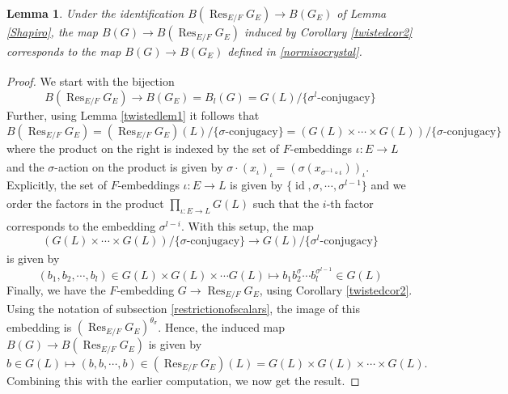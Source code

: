 \documentclass[11pt,a4paper]{article}
\theoremstyle{definition}
\theoremstyle{plain}
\newtheorem{Le}[shared]{Lemma}
\theoremstyle{remark}
\theoremstyle{plain}
\DeclareMathOperator{\Res}{Res}
\DeclareMathOperator{\id}{id}
\begin{document}
\begin{Le}
    Under the identification $B(\Res_{E/F}G_E) \xrightarrow[]{} B(G_E)$ of Lemma \ref{Shapiro}, the map $B(G) \xrightarrow[]{} B(\Res_{E/F}G_E)$ induced by Corollary \ref{twistedcor2} corresponds to the map $B(G) \xrightarrow[]{} B(G_E)$ defined in \ref{normisocrystal}.
\end{Le}
\begin{proof}
    We start with the bijection $$B(\Res_{E/F}G_E) \xrightarrow[]{} B(G_E) = B_l(G) = G(L)/\{\sigma^l\text{-conjugacy}\}$$   Further, using Lemma \ref{twistedlem1} it follows that $$B(\Res_{E/F}G_E) =  (\Res_{E/F}G_E)(L)/\{\sigma \text{-conjugacy} \} = (G(L)\times \cdots \times G(L))/\{ \sigma\text{-conjugacy} \} $$ where the product on the right is indexed by the set of $F$-embeddings $\iota: E \xrightarrow[]{} L$ and the $\sigma$-action on the product is given by $\sigma \cdot (x_{\iota})_{\iota} = (\sigma (x_{\sigma^{-1} \circ \iota}))_{\iota}$. Explicitly, the set of $F$-embeddings $\iota: E \xrightarrow[]{} L$ is given by $\{ \id, \sigma, \cdots, \sigma^{l-1} \}$ and we order the factors in the product $\prod_{\iota: E \xrightarrow[]{} L} G(L)$ such that the $i$-th factor corresponds to the embedding $\sigma^{l - i}$. With this setup, the map $$ (G(L)\times \cdots \times G(L))/\{ \sigma\text{-conjugacy} \} \xrightarrow[]{} G(L)/\{\sigma^l\text{-conjugacy}\}$$ is given by $$ (b_1, b_2, \cdots, b_l) \in G(L) \times G(L) \times \cdots G(L) \mapsto b_1 b_2^{\sigma} \cdots b_l^{\sigma^{l-1}} \in G(L)$$ Finally, we have the $F$-embedding $G \xrightarrow[]{} \Res_{E/F}G_E$, using Corollary \ref{twistedcor2}. Using the notation of subsection \ref{restrictionofscalars}, the image of this embedding is $(\Res_{E/F}G_E)^{\theta_{\sigma}}$. Hence, the induced map $B(G) \xrightarrow[]{} B(\Res_{E/F}G_E)$ is given by $$ b \in G(L) \mapsto (b,b,\cdots,b) \in (\Res_{E/F}G_E)(L) = G(L) \times G(L) \times \cdots \times G(L). $$
    Combining this with the earlier computation, we now get the result.
\end{proof}
\end{document}
